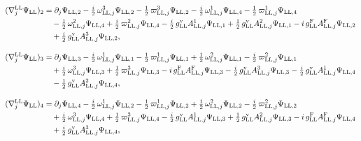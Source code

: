 \documentclass[
  10pt,
]{article}
\begin{document}
\[\begin{aligned}
(\nabla^{\rm LL}_j\Psi_{\rm LL})_2&=\partial_j\Psi_{{\rm LL},2}-\tfrac{i}{2}\,\omega^{3}_{{\rm LL},j}\Psi_{{\rm LL},2}-\tfrac{1}{2}\,\varpi^{3}_{{\rm LL},j}\Psi_{{\rm LL},2}-\tfrac{i}{2}\,\omega^{1}_{{\rm LL},j}\Psi_{{\rm LL},4}-\tfrac{1}{2}\,\varpi^{1}_{{\rm LL},j}\Psi_{{\rm LL},4}\\
&\quad -\tfrac{1}{2}\,\omega^{2}_{{\rm LL},j}\Psi_{{\rm LL},4}+\tfrac{i}{2}\,\varpi^{2}_{{\rm LL},j}\Psi_{{\rm LL},4}-\tfrac{i}{2}\,g^{\rm v}_{\rm LL}A^{1}_{{\rm LL},j}\Psi_{{\rm LL},1}+\tfrac{1}{2}\,g^{\rm v}_{\rm LL}A^{2}_{{\rm LL},j}\Psi_{{\rm LL},1}-i\,g^{\rm F}_{\rm LL}A^{\rm F}_{{\rm LL},j}\Psi_{{\rm LL},2}\\
&\quad +\tfrac{i}{2}\,g^{\rm v}_{\rm LL}A^{3}_{{\rm LL},j}\Psi_{{\rm LL},2},
\end{aligned}\]

\[\begin{aligned}
(\nabla^{\rm LL}_j\Psi_{\rm LL})_3&=\partial_j\Psi_{{\rm LL},3}-\tfrac{i}{2}\,\omega^{1}_{{\rm LL},j}\Psi_{{\rm LL},1}-\tfrac{1}{2}\,\varpi^{1}_{{\rm LL},j}\Psi_{{\rm LL},1}+\tfrac{1}{2}\,\omega^{2}_{{\rm LL},j}\Psi_{{\rm LL},1}-\tfrac{i}{2}\,\varpi^{2}_{{\rm LL},j}\Psi_{{\rm LL},1}\\
&\quad +\tfrac{i}{2}\,\omega^{3}_{{\rm LL},j}\Psi_{{\rm LL},3}+\tfrac{1}{2}\,\varpi^{3}_{{\rm LL},j}\Psi_{{\rm LL},3}-i\,g^{\rm F}_{\rm LL}A^{\rm F}_{{\rm LL},j}\Psi_{{\rm LL},3}-\tfrac{i}{2}\,g^{\rm v}_{\rm LL}A^{3}_{{\rm LL},j}\Psi_{{\rm LL},3}-\tfrac{i}{2}\,g^{\rm v}_{\rm LL}A^{1}_{{\rm LL},j}\Psi_{{\rm LL},4}\\
&\quad -\tfrac{1}{2}\,g^{\rm v}_{\rm LL}A^{2}_{{\rm LL},j}\Psi_{{\rm LL},4},
\end{aligned}\]

\[\begin{aligned}
(\nabla^{\rm LL}_j\Psi_{\rm LL})_4&=\partial_j\Psi_{{\rm LL},4}-\tfrac{i}{2}\,\omega^{1}_{{\rm LL},j}\Psi_{{\rm LL},2}-\tfrac{1}{2}\,\varpi^{1}_{{\rm LL},j}\Psi_{{\rm LL},2}+\tfrac{1}{2}\,\omega^{2}_{{\rm LL},j}\Psi_{{\rm LL},2}-\tfrac{i}{2}\,\varpi^{2}_{{\rm LL},j}\Psi_{{\rm LL},2}\\
&\quad +\tfrac{i}{2}\,\omega^{3}_{{\rm LL},j}\Psi_{{\rm LL},4}+\tfrac{1}{2}\,\varpi^{3}_{{\rm LL},j}\Psi_{{\rm LL},4}-\tfrac{i}{2}\,g^{\rm v}_{\rm LL}A^{1}_{{\rm LL},j}\Psi_{{\rm LL},3}+\tfrac{1}{2}\,g^{\rm v}_{\rm LL}A^{2}_{{\rm LL},j}\Psi_{{\rm LL},3}-i\,g^{\rm F}_{\rm LL}A^{\rm F}_{{\rm LL},j}\Psi_{{\rm LL},4}\\
&\quad +\tfrac{i}{2}\,g^{\rm v}_{\rm LL}A^{3}_{{\rm LL},j}\Psi_{{\rm LL},4},
\end{aligned}\]
\end{document}

